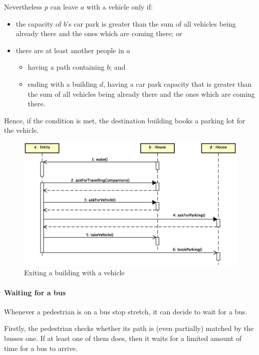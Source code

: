 Nevertheless $p$ can leave $a$ with a vehicle only if:
\begin{itemize}
  \item the capacity of $b$'s car park is greater than the sum of all
vehicles being already there and the ones which are coming there; or
  \item there are at least another people in $a$
  \begin{itemize}
    \item having a path containing $b$; and
    \item ending with a building $d$, having a car park capacity
    that is greater than
	the sum of all vehicles being already there and the ones
	which are coming there.
  \end{itemize}
\end{itemize}
Hence, if the condition is met, the destination building books
a parking lot for the vehicle.

\begin{figure}[H]
  \centering
  \includegraphics[width=\columnwidth,trim=1 0 0 0,clip]
    {images/solution/going_out_with_vehicle.eps}
  \caption{Exiting a building with a vehicle}
  \label{fig:app-inter-vehicle}
\end{figure}

\paragraph{Waiting for a bus}
Whenever a pedestrian is on a bus stop stretch,
it can decide to wait for a bus.

Firstly, the pedestrian checks whether its path is (even partially)
matched by the busses one.
If at least one of them does, then it waits
for a limited amount of time for a bus to arrive.

